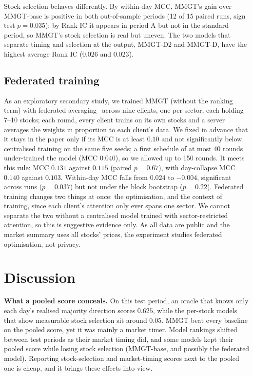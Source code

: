 \documentclass[conference]{IEEEtran}
\begin{document}
Stock selection behaves differently. By within-day MCC, MMGT's gain over MMGT-base
is positive in both out-of-sample periods (12 of 15 paired runs, sign test
$p=0.035$); by Rank IC it appears in period A but not in the standard period, so
MMGT's stock selection is real but uneven. The two models that separate timing and
selection at the output, MMGT-D2 and MMGT-D, have the highest average Rank IC
($0.026$ and $0.023$).

\subsection{Federated training}
\label{sec:fed}

As an exploratory secondary study, we trained MMGT (without the ranking term) with federated
averaging~\cite{mcmahan2017fedavg} across nine clients, one per sector, each holding
7--10 stocks; each round, every client trains on its own stocks and a server averages
the weights in proportion to each client's data. We fixed in advance that it stays
in the paper only if its MCC is at least $0.10$ and not significantly below
centralised training on the same five seeds; a first schedule of at most 40 rounds
under-trained the model (MCC $0.040$), so we allowed up to 150 rounds. It meets this
rule: MCC $0.131$ against $0.115$ (paired $p=0.67$), with day-collapse MCC $0.140$
against $0.103$. Within-day MCC falls from $0.024$ to $-0.004$, significant across
runs ($p=0.037$) but not under the block bootstrap ($p=0.22$). Federated training
changes two things at once: the optimisation, and the context of training, since each
client's attention only ever spans one sector. We cannot separate the two without a
centralised model trained with sector-restricted attention, so this is suggestive
evidence only. As all data are public and the market summary uses all stocks'
prices, the experiment studies federated optimisation, not privacy.

\section{Discussion}
\label{sec:disc}

\textbf{What a pooled score conceals.} On this test period, an oracle that knows
only each day's realised majority direction scores $0.625$, while the per-stock
models that show measurable stock selection sit around $0.05$. MMGT beat every
baseline on the pooled score, yet it was mainly a market timer. Model rankings
shifted between test periods as their market timing did, and some models kept their
pooled score while losing stock selection (MMGT-base, and possibly the federated
model). Reporting stock-selection and market-timing scores next to the pooled one
is cheap, and it brings these effects into view.
\end{document}
